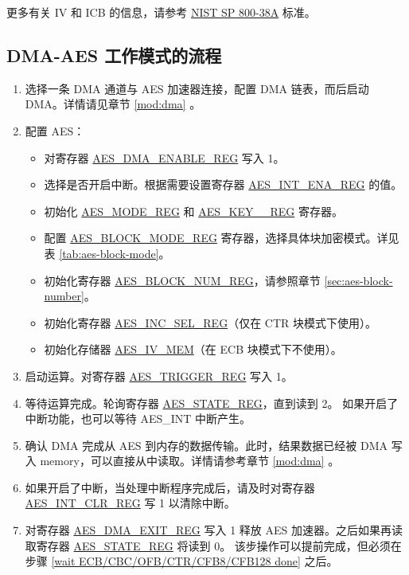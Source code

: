 \documentclass[main\_\_CN.tex]{subfiles}
\begin{document}
更多有关 IV 和 ICB 的信息，请参考 \href{https://nvlpubs.nist.gov/nistpubs/Legacy/SP/nistspecialpublication800-38a.pdf}{NIST SP 800-38A} 标准。

\subsection{DMA-AES 工作模式的流程 }

\begin{enumerate}
    \item 选择一条 DMA 通道与 AES 加速器连接，配置 DMA 链表，而后启动 DMA。详情请见章节 \ref{mod:dma} \textit{}。
    \item 配置 AES：
    \begin{itemize}
        \item 对寄存器 \hyperref[regdesc:AESDMAENABLEREG]{AES\_DMA\_ENABLE\_REG} 写入 1。
        \item 选择是否开启中断。根据需要设置寄存器 \hyperref[regdesc:AESINTENAREG]{AES\_INT\_ENA\_REG} 的值。
        \item 初始化 \hyperref[regdesc:AESMODEREG]{AES\_MODE\_REG} 和 \hyperref[regdesc:AESKEYnREG]{AES\_KEY\_\_REG} 寄存器。
        \item 配置 \hyperref[regdesc:AESBLOCKMODEREG]{AES\_BLOCK\_MODE\_REG} 寄存器，选择具体块加密模式。详见表 \ref{tab:aes-block-mode}。
        \item 初始化寄存器 \hyperref[regdesc:AESBLOCKNUMREG]{AES\_BLOCK\_NUM\_REG}，请参照章节 \ref{sec:aes-block-number}。
        \item 初始化寄存器 \hyperref[regdesc:AESINCSELREG]{AES\_INC\_SEL\_REG}（仅在 CTR 块模式下使用）。
        \item 初始化存储器 \hyperref[memdesc:AESIVMEM]{AES\_IV\_MEM}（在 ECB 块模式下不使用）。
    \end{itemize}
    \item 启动运算。对寄存器 \hyperref[regdesc:AESTRIGGERREG]{AES\_TRIGGER\_REG} 写入 1。
    \item \label{wait ECB/CBC/OFB/CTR/CFB8/CFB128 done}
            等待运算完成。轮询寄存器 \hyperref[regdesc:AESSTATEREG]{AES\_STATE\_REG}，直到读到 2。
            如果开启了中断功能，也可以等待 AES\_INT 中断产生。
    \item 确认 DMA 完成从 AES 到内存的数据传输。此时，结果数据已经被 DMA 写入 memory，可以直接从中读取。详情请参考章节 \ref{mod:dma} \textit{}。
    \item 如果开启了中断，当处理中断程序完成后，请及时对寄存器 \hyperref[regdesc:AESINTCLRREG]{AES\_INT\_CLR\_REG} 写 1 以清除中断。
    \item 对寄存器 \hyperref[regdesc:AESDMAEXITREG]{AES\_DMA\_EXIT\_REG} 写入 1 释放 AES 加速器。之后如果再读取寄存器 \hyperref[regdesc:AESSTATEREG]{AES\_STATE\_REG} 将读到 0。
    该步操作可以提前完成，但必须在步骤 \ref{wait ECB/CBC/OFB/CTR/CFB8/CFB128 done} 之后。
\end{enumerate}
\end{document}

